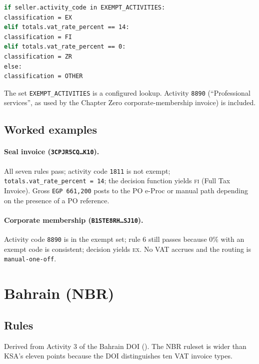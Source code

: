 \documentclass[11pt,a4paper,twoside]{report}
\newcommand{\corpus}{}
\begin{document}
\begin{lstlisting}[language=bash,basicstyle=\ttfamily\small]
if seller.activity_code in EXEMPT_ACTIVITIES:
classification = EX
elif totals.vat_rate_percent == 14:
classification = FI
elif totals.vat_rate_percent == 0:
classification = ZR
else:
classification = OTHER
\end{lstlisting}
The set \texttt{EXEMPT\_ACTIVITIES} is a configured lookup. Activity
\texttt{8890} (``Professional services'', as used by the Chapter Zero
corporate-membership invoice) is included.

\subsection{Worked examples}

\paragraph{Seal invoice (\texttt{3CPJR5CQ\ldots K10}).}
All seven rules pass; activity code \texttt{1811} is not exempt;
\texttt{totals.vat\_rate\_percent~=~14}; the decision function yields
\textsc{fi} (Full Tax Invoice). Gross \texttt{EGP~661{,}200} posts to
the PO e-Proc or manual path depending on the presence of a PO
reference.

\paragraph{Corporate membership (\texttt{B1STE8RH\ldots SJ10}).}
Activity code \texttt{8890} is in the exempt set; rule 6 still passes
because 0\% with an exempt code is consistent; decision yields \textsc{ex}.
No VAT accrues and the routing is \texttt{manual-one-off}.

\section{Bahrain (NBR)}

\subsection{Rules}

Derived from Activity 3 of the Bahrain DOI
(\corpus{}). The
NBR ruleset is wider than KSA's eleven points because the DOI
distinguishes ten VAT invoice types.
\end{document}
